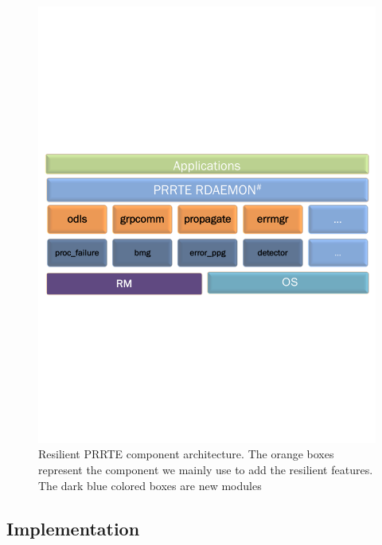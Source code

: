 \documentclass[sigconf]{acmart}
\newcommand{\prrte}[0]{\textsc{PRRTE}\xspace}
\begin{document}
\begin{figure}[h]
  \centering
  \includegraphics[trim=0.2cm 9.0cm 0.2cm 9cm,width=\linewidth]{PMIx_PRRTE.pdf}
  \caption{Resilient \prrte component architecture. The orange boxes represent the component we mainly use to add the resilient features. The dark blue colored boxes are new modules}\label{fig:prrte}
\end{figure}

\subsection{Implementation}

\end{document}
